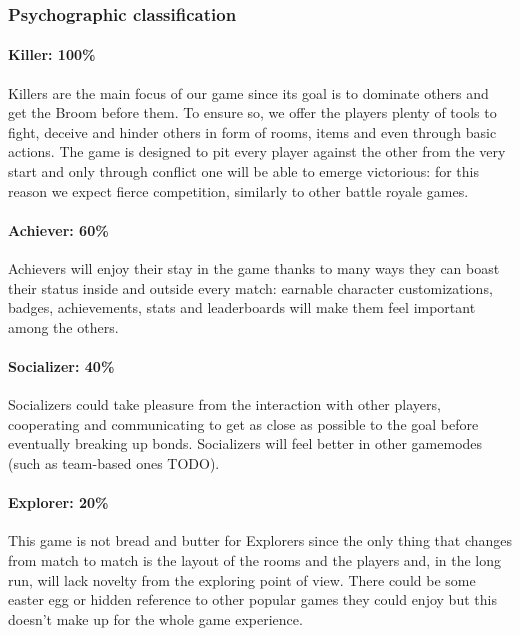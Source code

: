 \subsubsection{Psychographic classification}


\paragraph{Killer: 100\%}
Killers are the main focus of our game since its goal is to dominate others and get the Broom before them. To ensure so, we offer the players plenty of tools to fight, deceive and hinder others in form of rooms, items and even through basic actions. The game is designed to pit every player against the other from the very start and only through conflict one will be able to emerge victorious: for this reason we expect fierce competition, similarly to other battle royale games.

\paragraph{Achiever: 60\%}
Achievers will enjoy their stay in the game thanks to many ways they can boast their status inside and outside every match: earnable character customizations, badges, achievements, stats and leaderboards will make them feel important among the others.

\paragraph{Socializer: 40\%}
Socializers could take pleasure from the interaction with other players, cooperating and communicating to get as close as possible to the goal before eventually breaking up bonds. Socializers will feel better in other gamemodes (such as team-based ones TODO).

\paragraph{Explorer: 20\%}
This game is not bread and butter for Explorers since the only thing that changes from match to match is the layout of the rooms and the players and, in the long run, will lack novelty from the exploring point of view. There could be some easter egg or hidden reference to other popular games they could enjoy but this doesn't make up for the whole game experience.



\pagebreak